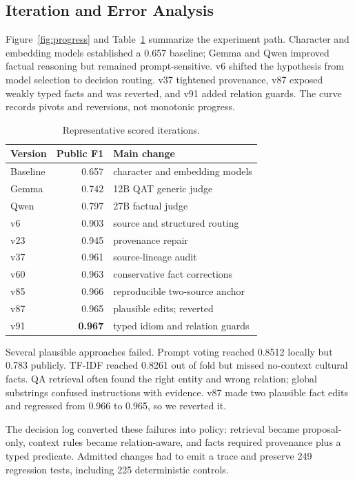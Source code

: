 \documentclass[11pt]{article}
\begin{document}
\subsection{Iteration and Error Analysis}

Figure~\ref{fig:progress} and Table~\ref{tab:versions} summarize the experiment path. Character and embedding models established a 0.657 baseline; Gemma and Qwen improved factual reasoning but remained prompt-sensitive. v6 shifted the hypothesis from model selection to decision routing. v37 tightened provenance, v87 exposed weakly typed facts and was reverted, and v91 added relation guards. The curve records pivots and reversions, not monotonic progress.

\begin{table}[t]
\caption{Representative scored iterations.}
\label{tab:versions}
\centering
\small
\begin{tabularx}{\columnwidth}{@{}l r X@{}}
\toprule
Version & Public F1 & Main change \\
\midrule
Baseline & 0.657 & character and embedding models \\
Gemma & 0.742 & 12B QAT generic judge \\
Qwen & 0.797 & 27B factual judge \\
v6 & 0.903 & source and structured routing \\
v23 & 0.945 & provenance repair \\
v37 & 0.961 & source-lineage audit \\
v60 & 0.963 & conservative fact corrections \\
v85 & 0.966 & reproducible two-source anchor \\
v87 & 0.965 & plausible edits; reverted \\
v91 & \textbf{0.967} & typed idiom and relation guards \\
\bottomrule
\end{tabularx}
\end{table}

Several plausible approaches failed. Prompt voting reached 0.8512 locally but 0.783 publicly. TF-IDF reached 0.8261 out of fold but missed no-context cultural facts. QA retrieval often found the right entity and wrong relation; global substrings confused instructions with evidence. v87 made two plausible fact edits and regressed from 0.966 to 0.965, so we reverted it.

The decision log converted these failures into policy: retrieval became proposal-only, context rules became relation-aware, and facts required provenance plus a typed predicate. Admitted changes had to emit a trace and preserve 249 regression tests, including 225 deterministic controls.
\end{document}
